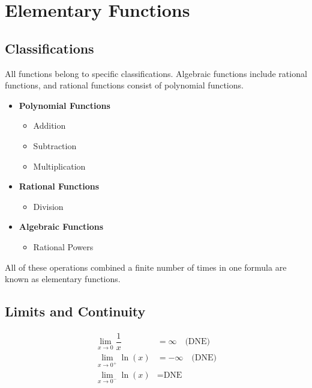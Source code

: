 \chapter{Elementary Functions}

\section{Classifications}
All functions belong to specific classifications. Algebraic functions include rational functions, and rational functions consist of polynomial functions.

\begin{itemize}
    \item \textbf{Polynomial Functions}
    \begin{itemize}
        \item Addition
        \item Subtraction
        \item Multiplication
    \end{itemize}
    \item \textbf{Rational Functions}
    \begin{itemize}
        \item Division
    \end{itemize}
    \item \textbf{Algebraic Functions}
    \begin{itemize}
        \item Rational Powers
    \end{itemize}
\end{itemize}
All of these operations combined a finite number of times in one formula are known as elementary functions.

\section{Limits and Continuity}

\begin{align*}
    \lim_{x \to 0} \dfrac{1}{x} &= \infty \quad \text{(DNE)} \\
    \lim_{x \to 0^+} \ln(x) &= -\infty \quad \text{(DNE)} \\
    \lim_{x \to 0^-} \ln(x) &= \text{DNE}
\end{align*}